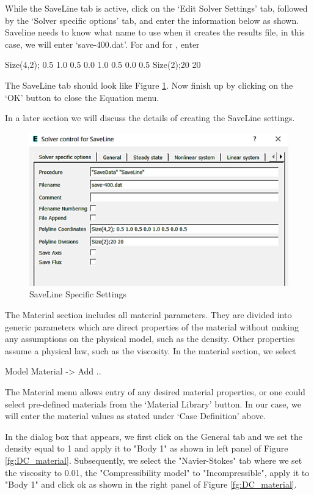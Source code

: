 While the SaveLine tab is active, click on the `Edit Solver Settings' tab, followed by the
`Solver specific options' tab, and enter the information below as shown.  Saveline needs to
know what name to use when it creates the results file, in this case, we will enter
`save-400.dat'.  For  and for , enter

\ttbegin
Size(4,2); 0.5 1.0 0.5 0.0 1.0 0.5 0.0 0.5
Size(2);20 20
\ttend  

The SaveLine tab should look like Figure \ref{fg:DC_saveline}.  Now finish up by clicking
on the `OK' button to close the Equation menu.

In a later section we will discuss the details of creating the SaveLine settings.

\begin{figure}[H]
\centering
\includegraphics[scale=1.3]{DC_saveline}
\caption{SaveLine Specific Settings}\label{fg:DC_saveline}
\end{figure}

\newpage
The Material section includes all material parameters. They are divided into generic parameters which are direct properties of the material without making any assumptions on the physical model, such as the density. Other properties assume a physical law, such as the viscosity. 
In the material section, we select 

\ttbegin
Model
  Material -> Add .. 
\ttend  

The Material menu allows entry of any desired material properties, or one could select pre-defined
materials from the `Material Library' button.  In our case, we will enter the material values as stated
under `Case Definition' above.

In the dialog box that appears, we first click on the General tab and we set the density equal to 1 and apply it to "Body 1" as shown in left panel of Figure \ref{fg:DC_material}.
Subsequently, we select the "Navier-Stokes" tab where we set the viscosity to 0.01, the "Compressibility model" to "Incompressible", apply it to "Body 1" and click ok as shown in the right panel of Figure \ref{fg:DC_material}.

